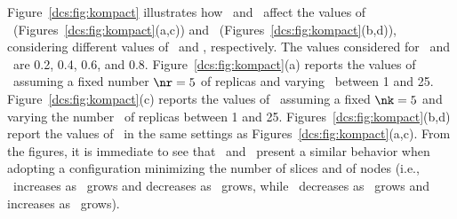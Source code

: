 {Figure~\ref{dcs:fig:kompact} illustrates how \nk\ and \nr\ affect the
values of \PF\ (Figures~\ref{dcs:fig:kompact}(a,c)) and
\PC\ (Figures~\ref{dcs:fig:kompact}(b,d)), considering different values of
\pf\ and \pc, respectively. The values considered for \pf\ and
\pc\ are 0.2, 0.4, 0.6, and 0.8. Figure~\ref{dcs:fig:kompact}(a) reports
the values of \PF\ assuming a fixed number $\nr=5$ of replicas and
varying \nk\ between 1 and 25.  Figure~\ref{dcs:fig:kompact}(c) reports
the values of \PF\ assuming a fixed $\nk=5$ and varying the number
\nr\ of replicas between 1 and 25. Figures~\ref{dcs:fig:kompact}(b,d)
report the values of \PC\ in the same settings as
Figures~\ref{dcs:fig:kompact}(a,c). From the figures, it is immediate to
see that \PF\ and \PC\ present a similar behavior when adopting a
configuration minimizing the number of slices and of nodes (i.e.,
\PF\ increases as \nk\ grows and decreases as \nr\ grows, while
\PC\ decreases as \nk\ grows and increases as \nr\ grows).


}
